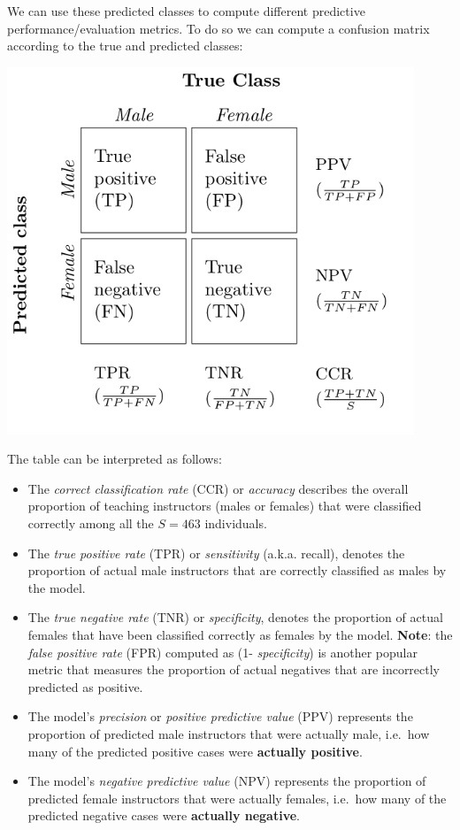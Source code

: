 \documentclass[
  letterpaper,
  DIV=11,
  numbers=noendperiod]{scrartcl}
\begin{document}
We can use these predicted classes to compute different predictive
performance/evaluation metrics. To do so we can compute a confusion
matrix according to the true and predicted classes:

\begin{center}
\includegraphics[width=4.79167in,height=\textheight]{tikz__pictures-1.png}
\end{center}

The table can be interpreted as follows:

\begin{itemize}
\item
  The \emph{correct classification rate} (CCR) or \emph{accuracy}
  describes the overall proportion of teaching instructors (males or
  females) that were classified correctly among all the \(S = 463\)
  individuals.
\item
  The \emph{true positive rate} (TPR) or \emph{sensitivity} (a.k.a.
  recall), denotes the proportion of actual male instructors that are
  correctly classified as males by the model.
\item
  The \emph{true negative rate} (TNR) or \emph{specificity}, denotes the
  proportion of actual females that have been classified correctly as
  females by the model. \textbf{Note}: the \emph{false positive rate}
  (FPR) computed as (1- \emph{specificity}) is another popular metric
  that measures the proportion of actual negatives that are incorrectly
  predicted as positive.
\item
  The model's \emph{precision} or \emph{positive predictive value} (PPV)
  represents the proportion of predicted male instructors that were
  actually male, i.e.~how many of the predicted positive cases were
  \textbf{actually positive}.
\item
  The model's \emph{negative predictive value} (NPV) represents the
  proportion of predicted female instructors that were actually females,
  i.e.~how many of the predicted negative cases were \textbf{actually
  negative}.
\end{itemize}
\end{document}
